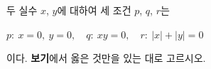 두 실수 $x$, $y$에 대하여 세 조건 $p$, $q$, $r$는 \begin{center}$p:\ x=0,\ y=0,\quad q:\ xy=0,\quad r:\ |x|+|y|=0$\end{center} 이다. \textbf{보기}에서 옳은 것만을 있는 대로 고르시오. 

